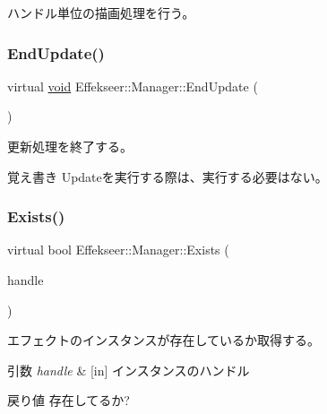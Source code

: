 ハンドル単位の描画処理を行う。 

\mbox{\label{class_effekseer_1_1_manager_a49311566caa5abcbff1b836473b046ab}} 
\subsubsection{\texorpdfstring{End\+Update()}{EndUpdate()}}
{\footnotesize\ttfamily virtual \mbox{\hyperlink{namespace_effekseer_ab34c4088e512200cf4c2716f168deb56}{void}} Effekseer\+::\+Manager\+::\+End\+Update (\begin{DoxyParamCaption}{ }\end{DoxyParamCaption})\hspace{0.3cm}{\ttfamily [pure virtual]}}



更新処理を終了する。 

\begin{DoxyNote}{覚え書き}
Updateを実行する際は、実行する必要はない。 
\end{DoxyNote}
\mbox{\label{class_effekseer_1_1_manager_ad95297e9170c9f9874eb6bf951aa5dc0}} 
\subsubsection{\texorpdfstring{Exists()}{Exists()}}
{\footnotesize\ttfamily virtual bool Effekseer\+::\+Manager\+::\+Exists (\begin{DoxyParamCaption}\item[{\mbox{\hyperlink{namespace_effekseer_afba58b8d812da862190e9bbfc040824a}{Handle}}}]{handle }\end{DoxyParamCaption})\hspace{0.3cm}{\ttfamily [pure virtual]}}



エフェクトのインスタンスが存在しているか取得する。 


\begin{DoxyParams}{引数}
{\em handle} & \mbox{[}in\mbox{]} インスタンスのハンドル \\
\hline
\end{DoxyParams}
\begin{DoxyReturn}{戻り値}
存在してるか? 
\end{DoxyReturn}
\mbox{\label{class_effekseer_1_1_manager_ab810f714df5d12c566664183f365cbf4}} 
